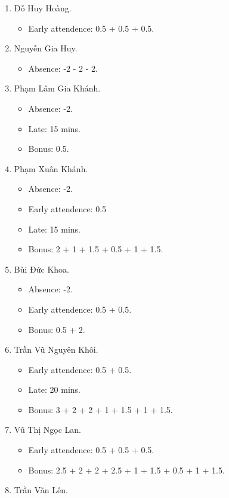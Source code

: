 \documentclass{article}
\begin{document}
\begin{enumerate}
	\item {\sc Đỗ Huy Hoàng.}
	\begin{itemize}
		\item Early attendence: 0.5 + 0.5 + 0.5.
	\end{itemize}
	\item {\sc Nguyễn Gia Huy.}
	\begin{itemize}
		\item Absence: -2 - 2 - 2.
	\end{itemize}
	\item {\sc Phạm Lâm Gia Khánh.}
	\begin{itemize}
		\item Absence: -2.
		\item Late: 15 mins.
		\item Bonus: 0.5.
	\end{itemize}
	\item {\sc Phạm Xuân Khánh.}
	\begin{itemize}
		\item Absence: -2.
		\item Early attendence: 0.5
		\item Late: 15 mins.
		\item Bonus: 2 + 1 + 1.5 + 0.5 + 1 + 1.5.
	\end{itemize}
	\item {\sc Bùi Đức Khoa.}
	\begin{itemize}
		\item Absence: -2.
		\item Early attendence: 0.5 + 0.5.
		\item Bonus: 0.5 + 2.
	\end{itemize}
	\item {\sc Trần Vũ Nguyên Khôi.}
	\begin{itemize}
		\item Early attendence: 0.5 + 0.5.
		\item Late: 20 mins.
		\item Bonus: 3 + 2 + 2 + 1 + 1.5 + 1 + 1.5.
	\end{itemize}
	\item {\sc Vũ Thị Ngọc Lan.}
	\begin{itemize}
		\item Early attendence: 0.5 + 0.5 + 0.5.
		\item Bonus: 2.5 + 2 + 2 + 2.5 + 1 + 1.5 + 0.5 + 1 + 1.5.
	\end{itemize}
	\item {\sc Trần Văn Lên.}
	\begin{itemize}

\end{itemize}
\end{enumerate}
\end{document}
